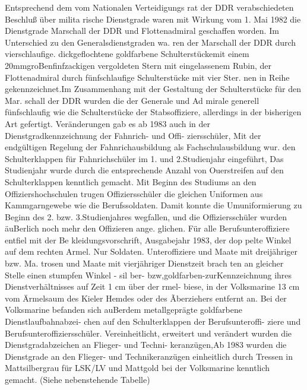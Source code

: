 

Entsprechend dem vom Nationalen Verteidigungs
rat der DDR verabschiedeten Beschluß über milita
rische Dienstgrade waren mit Wirkung vom 1. Mai
1982 die Dienstgrade Marschall der DDR und
Flottenadmiral geschaffen worden.
Im Unterschied zu den Generalsdienstgraden wa.
ren der Marschall der DDR durch vierschlaufige.
dickgeflochtene goldfarbene Schulterstückemit
einem 20mmgroBenfinfzackigen vergoldeten
Stern mit eingelassenem Rubin, der Flottenadmiral
durch fünfschlaufige Schulterstücke mit vier Ster.
nen in Reihe gekennzeichnet.Im Zusammenhang
mit der Gestaltung der Schulterstücke für den Mar.
schall der DDR wurden die der Generale und Ad
mirale generell fünfschlaufig wie die Schulterstücke
der Stabsoffiziere, allerdings in der bisherigen Art
gefertigt.
Veränderungen gab es ab 1983 auch in der
Dienstgradkennzeichnung der Fahnrich- und Offi-
ziersschüler, Mit der endgültigen Regelung der
Fahnrichausbildung als Fachschulausbildung wur.
den Schulterklappen für Fahnrichschüler im 1. und
2.Studienjahr eingeführt, Das Studienjahr wurde
durch die entsprechende Anzahl von Ouerstreifen
auf den Schulterklappen kenntlich gemacht. Mit
Beginn des Studiums an den Offiziershochschulen
trugen Offiziersschüler die gleichen Uniformen aus
Kammgarngewebe wie die Berufssoldaten. Damit
konnte die Umuniformierung zu Beginn des 2. bzw.
3.Studienjahres wegfallen, und die Offiziersschüler
wurden äuBerlich noch mehr den Offizieren ange.
glichen.
Für alle Berufsunteroffiziere entfiel mit der Be
kleidungsvorschrift, Ausgabejahr 1983, der dop
pelte Winkel auf dem rechten Armel. Nur Soldaten.
Unteroffiziere und Maate mit dreijähriger bzw. Ma.
trosen und Maate mit vierjähriger Dienstzeit brach
ten an gleicher Stelle einen stumpfen Winkel - sil
ber- bzw,goldfarben-zurKennzeichnung ihres Dienstverhältnisses auf Zeit 1 cm über der rmel-
biese, in der Volksmarine 13 cm vom Ärmelsaum
des Kieler Hemdes oder des Ãberziehers entfernt
an. Bei der Volksmarine befanden sich auBerdem
metallgeprägte goldfarbene Dienstlaufbahnabzei-
chen auf den Schulterklappen der Berufsunteroffi-
ziere und Berufsunteroffiziersschüler.
Vereinheitlicht, erweitert und verändert wurden
die Dienstgradabzeichen an Flieger- und Techni-
keranzügen,Ab 1983 wurden die Dienstgrade an
den Flieger- und Technikeranzügen einheitlich
durch Tressen in Mattsilbergrau für LSK/LV und
Mattgold bei der Volksmarine kenntlich gemacht.
(Siehe nebenstehende Tabelle)